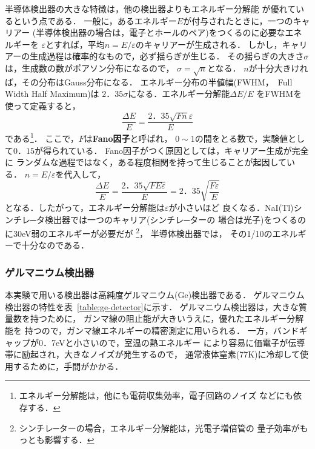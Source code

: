 \documentclass[a4j,10pt,oneside,openany]{jsbook}
\begin{document}
{半導体検出器の大きな特徴は，他の検出器よりもエネルギー分解能
が優れているという点である．
一般に，あるエネルギー$E$が付与されたときに，一つのキャリアー
(半導体検出器の場合は，電子とホールのペア)をつくるのに必要なエネルギーを
$\varepsilon$とすれば，平均$n=E/\varepsilon$のキャリアーが生成される．
しかし，キャリアーの生成過程は確率的なもので，必ず揺らぎが生じる．
その揺らぎの大きさ$\sigma$は，生成数の数がポアソン分布になるので，
$\sigma = \sqrt{n}$となる．
$n$が十分大きければ，その分布はGauss分布になる．
エネルギー分布の半値幅(FWHM，~Full Width Half Maximum)は
$2．35\sigma$になる．エネルギー分解能$\Delta E/E$
をFWHMを使って定義すると，
\begin{equation}
  \frac{\Delta E}{E} = \frac{2．35\sqrt{Fn}\varepsilon}{E}
\end{equation}
である\footnote{エネルギー分解能は，他にも電荷収集効率，電子回路のノイズ
などにも依存する．}．
ここで，$F$は{\bf Fano因子}と呼ばれ，
$0\sim 1$の間をとる数で，実験値として$0．15$が得られている．
Fano因子がつく原因としては，キャリアー生成が完全に
ランダムな過程ではなく，ある程度相関を持って生じることが起因している．
$n=E/\varepsilon$を代入して，
\begin{equation}
  \frac{\Delta E}{E} = \frac{2．35\sqrt{FE\varepsilon}}{E}
  =2．35\sqrt{\frac{F\varepsilon}{E}}
\end{equation}
となる．したがって，エネルギー分解能は$\varepsilon$が小さいほど
良くなる．NaI(Tl)シンチレ─タ検出器では一つのキャリア(シンチレ─ターの
場合は光子)をつくるのに30eV弱のエネルギーが必要だが
\footnote{シンチレ─ターの場合，エネルギー分解能は，光電子増倍管の
量子効率がもっとも影響する．}，
半導体検出器では，
その1/10のエネルギーで十分なのである．


\subsubsection{ゲルマニウム検出器}

本実験で用いる検出器は高純度ゲルマニウム(Ge)検出器である．
ゲルマニウム検出器の特性を表~\ref{table:ge-detector}に示す．
ゲルマニウム検出器は，大きな質量数を持つために，
ガンマ線の阻止能が大きいうえに，優れたエネルギー分解能を
持つので，ガンマ線エネルギーの精密測定に用いられる．
一方，バンドギャップが0．7eVと小さいので，室温の熱エネルギー
により容易に価電子が伝導帯に励起され，大きなノイズが発生するので，
通常液体窒素(77K)に冷却して使用するために，手間がかかる．


}
\end{document}
